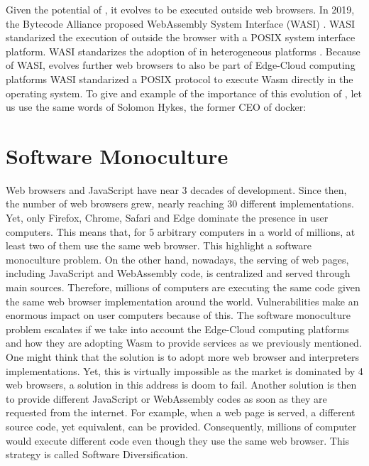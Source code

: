 Given the potential of \wasm, it evolves to be executed outside web browsers.
In 2019, the Bytecode Alliance \cite{bytecodealliance} proposed WebAssembly System Interface (WASI) \cite{WASI}. 
WASI standarized the execution of \wasm outside the browser with a POSIX system interface platform.
WASI standarizes the adoption of \wasm in heterogeneous platforms \cite{bryant2020webassembly}. 
Because of WASI, \wasm evolves further web browsers to also be part of Edge-Cloud computing platforms \cite{9640153, wen2020wasmachine}
WASI standarized a POSIX protocol to execute Wasm directly in the operating system. 
To give and example of the importance of this evolution of \wasm, let us use the same words of Solomon Hykes, the former CEO of docker: 

\vspace{0.5cm}

\begin{minipage}{0.8\linewidth}
\end{minipage}

\section{Software Monoculture}

Web browsers and JavaScript have near 3 decades of development.
Since then, the number of web browsers grew, nearly reaching 30 different implementations. 
Yet, only Firefox, Chrome, Safari and Edge dominate the presence in user computers.
This means that, for 5 arbitrary computers in a world of millions, at least two of them use the same web browser.
This highlight a software monoculture problem.
On the other hand, nowadays, the serving of web pages, including JavaScript and WebAssembly code, is centralized and served through main sources.
Therefore, millions of computers are executing the same code given the same web browser implementation around the world.
Vulnerabilities make an enormous impact on user computers because of this.
The software monoculture problem escalates if we take into account the Edge-Cloud computing platforms and how they are adopting Wasm to provide services as we previously mentioned.
One might think that the solution is to adopt more web browser and interpreters implementations. 
Yet, this is virtually impossible as the market is dominated by 4 web browsers, a solution in this address is doom to fail. 
Another solution is then to provide different JavaScript or WebAssembly codes as soon as they are requested from the internet. 
For example, when a web page is served, a different source code, yet equivalent, can be provided. 
Consequently, millions of computer would execute different code even though they use the same web browser.
This strategy is called Software Diversification.

